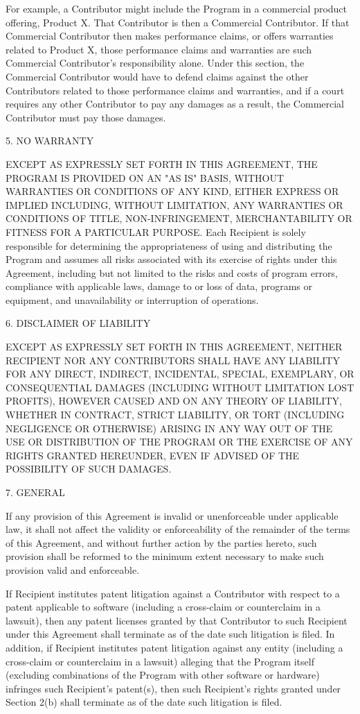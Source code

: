 \begin{scriptsize}
For example, a Contributor might include the Program in a commercial product offering, Product X. That Contributor is then a Commercial Contributor. If that Commercial Contributor then makes performance claims, or offers warranties related to Product X, those performance claims and warranties are such Commercial Contributor's responsibility alone. Under this section, the Commercial Contributor would have to defend claims against the other Contributors related to those performance claims and warranties, and if a court requires any other Contributor to pay any damages as a result, the Commercial Contributor must pay those damages.

5. NO WARRANTY

EXCEPT AS EXPRESSLY SET FORTH IN THIS AGREEMENT, THE PROGRAM IS PROVIDED ON AN "AS IS" BASIS, WITHOUT WARRANTIES OR CONDITIONS OF ANY KIND, EITHER EXPRESS OR IMPLIED INCLUDING, WITHOUT LIMITATION, ANY WARRANTIES OR CONDITIONS OF TITLE, NON-INFRINGEMENT, MERCHANTABILITY OR FITNESS FOR A PARTICULAR PURPOSE. Each Recipient is solely responsible for determining the appropriateness of using and distributing the Program and assumes all risks associated with its exercise of rights under this Agreement, including but not limited to the risks and costs of program errors, compliance with applicable laws, damage to or loss of data, programs or equipment, and unavailability or interruption of operations.

6. DISCLAIMER OF LIABILITY

EXCEPT AS EXPRESSLY SET FORTH IN THIS AGREEMENT, NEITHER RECIPIENT NOR ANY CONTRIBUTORS SHALL HAVE ANY LIABILITY FOR ANY DIRECT, INDIRECT, INCIDENTAL, SPECIAL, EXEMPLARY, OR CONSEQUENTIAL DAMAGES (INCLUDING WITHOUT LIMITATION LOST PROFITS), HOWEVER CAUSED AND ON ANY THEORY OF LIABILITY, WHETHER IN CONTRACT, STRICT LIABILITY, OR TORT (INCLUDING NEGLIGENCE OR OTHERWISE) ARISING IN ANY WAY OUT OF THE USE OR DISTRIBUTION OF THE PROGRAM OR THE EXERCISE OF ANY RIGHTS GRANTED HEREUNDER, EVEN IF ADVISED OF THE POSSIBILITY OF SUCH DAMAGES.

7. GENERAL

If any provision of this Agreement is invalid or unenforceable under applicable law, it shall not affect the validity or enforceability of the remainder of the terms of this Agreement, and without further action by the parties hereto, such provision shall be reformed to the minimum extent necessary to make such provision valid and enforceable.

If Recipient institutes patent litigation against a Contributor with respect to a patent applicable to software (including a cross-claim or counterclaim in a lawsuit), then any patent licenses granted by that Contributor to such Recipient under this Agreement shall terminate as of the date such litigation is filed. In addition, if Recipient institutes patent litigation against any entity (including a cross-claim or counterclaim in a lawsuit) alleging that the Program itself (excluding combinations of the Program with other software or hardware) infringes such Recipient's patent(s), then such Recipient's rights granted under Section 2(b) shall terminate as of the date such litigation is filed.


\end{scriptsize}
